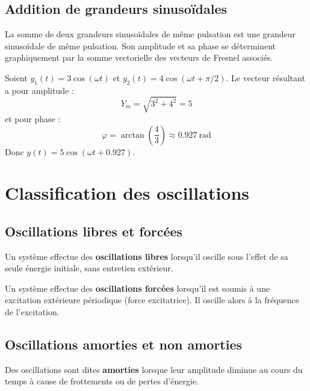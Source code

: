 \subsection{Addition de grandeurs sinusoïdales}

\begin{propriete}
La somme de deux grandeurs sinusoïdales de même pulsation est une grandeur sinusoïdale de même pulsation. Son amplitude et sa phase se déterminent graphiquement par la somme vectorielle des vecteurs de Fresnel associés.
\end{propriete}

\begin{exemple}
Soient $y_1(t) = 3\cos(\omega t)$ et $y_2(t) = 4\cos(\omega t + \pi/2)$. Le vecteur résultant a pour amplitude :
\[
Y_m = \sqrt{3^2 + 4^2} = 5
\]
et pour phase :
\[
\varphi = \arctan\left(\frac{4}{3}\right) \approx \SI{0.927}{\radian}
\]
Donc $y(t) = 5\cos(\omega t + 0.927)$.
\end{exemple}

\section{Classification des oscillations}

\subsection{Oscillations libres et forcées}

\begin{definition}
Un système effectue des \textbf{oscillations libres} lorsqu'il oscille sous l'effet de sa seule énergie initiale, sans entretien extérieur.
\end{definition}

\begin{definition}
Un système effectue des \textbf{oscillations forcées} lorsqu'il est soumis à une excitation extérieure périodique (force excitatrice). Il oscille alors à la fréquence de l'excitation.
\end{definition}

\subsection{Oscillations amorties et non amorties}

\begin{definition}
Des oscillations sont dites \textbf{amorties} lorsque leur amplitude diminue au cours du temps à cause de frottements ou de pertes d'énergie.
\end{definition}

